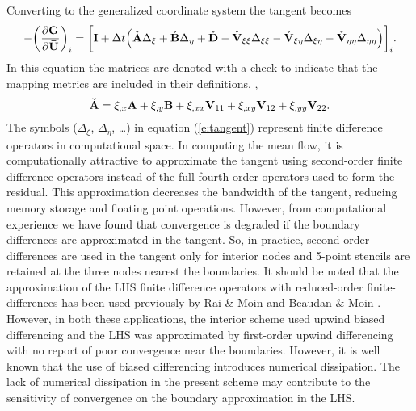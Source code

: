 Converting to the generalized coordinate system the tangent becomes
%
\begin{equation} \label{e:tangent}
  -\bigg(\frac{\partial {\bf G}}{\partial {\bf \bar U}}\bigg)_{i} =
   \bigg[ {\bf I} + \Delta t \Big (\check{{\bf A}} \Delta_{\xi} + 
                               \check{{\bf B}} \Delta_{\eta} + 
                               \check{{\bf D}} -
                               \check{\bf V}_{\xi\xi}   \Delta_{\xi\xi}  - 
                               \check{\bf V}_{\xi\eta}  \Delta_{\xi\eta} -
                               \check{\bf V}_{\eta\eta} \Delta_{\eta\eta} \Big)
  \bigg]_{i} .
\end{equation}
%
In this equation the matrices are denoted with a check to indicate that the
mapping metrics are included in their definitions, \eg,\ 
%
\begin{equation} \label{e:ss}
\check{{\bf A}} = \xi_{,x} {\bf A} + \xi_{,y} {\bf B} + \xi_{,xx} {\bf V}_{11} +
            \xi_{,xy} {\bf V}_{12} + \xi_{,yy} {\bf V}_{22} .
\end{equation}
%
The symbols ($\Delta_{\xi}$, $\Delta_{\eta}$, \ldots) in equation
(\ref{e:tangent}) represent finite difference operators in computational
space.  In computing the mean flow, it is computationally attractive to
approximate the tangent using second-order finite difference operators instead
of the full fourth-order operators used to form the residual.  This
approximation decreases the bandwidth of the tangent, reducing memory storage
and floating point operations.  However, from computational experience we have
found that convergence is degraded if the boundary differences are
approximated in the tangent.  So, in practice, second-order differences are
used in the tangent only for interior nodes and 5-point stencils are retained
at the three nodes nearest the boundaries.  It should be noted that the
approximation of the LHS finite difference operators with reduced-order
finite-differences has been used previously by Rai \& Moin \cite{RaMo:93} and
Beaudan \& Moin \cite{BeMo:94}.  However, in both these applications, the
interior scheme used upwind biased differencing and the LHS was approximated
by first-order upwind differencing with no report of poor convergence near the
boundaries.  However, it is well known that the use of biased differencing
introduces numerical dissipation.  The lack of numerical dissipation in the
present scheme may contribute to the sensitivity of convergence on the
boundary approximation in the LHS.

